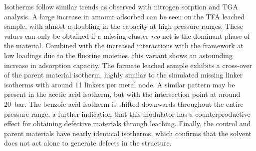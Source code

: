 Isotherms follow similar trends as observed with nitrogen sorption and
TGA analysis. A large increase in amount adsorbed can be
seen on the TFA leached sample, with almost a doubling in the 
capacity at high pressure ranges. These values can only be obtained 
if a missing cluster \textit{reo} net is the dominant phase of the 
material. Combined with the increased interactions with the framework
at low loadings due to the fluorine moieties, this variant shows an
astounding increase in adsorption capacity.
The formate leached sample exhibits a cross-over of the parent 
material isotherm, highly similar to the simulated missing linker isotherms 
with around 11 linkers per metal node. A similar pattern may be 
present in the acetic acid isotherm, but with the intersection point
at around \SI{20}{\bar}. The benzoic acid isotherm
is shifted downwards throughout the entire pressure range, a further
indication that this modulator has a counterproductive effect for
obtaining defective materials through leaching.
Finally, the control and parent materials have nearly identical isotherms,
which confirms that the solvent does not act alone to generate 
defects in the structure.
